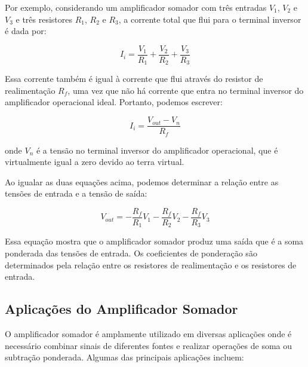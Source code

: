 \documentclass[12pt,twoside, a4paper, twocolumn]{article}
\begin{document}
Por exemplo, considerando um amplificador somador com três entradas $V_1$, $V_2$ e $V_3$ e três resistores $R_1$, $R_2$ e $R_3$, a corrente total que flui para o terminal inversor é dada por:


\begin{equation}
    I_i = \frac{V_1}{R_1} + \frac{V_2}{R_2} + \frac{V_3}{R_3}
\end{equation}


Essa corrente também é igual à corrente que flui através do resistor de realimentação $R_f$, uma vez que não há corrente que entra no terminal inversor do amplificador operacional ideal. Portanto, podemos escrever:


\begin{equation}
    I_i = \frac{V_{out} - V_n}{R_f}
\end{equation}


onde $V_n$ é a tensão no terminal inversor do amplificador operacional, que é virtualmente igual a zero devido ao terra virtual.


Ao igualar as duas equações acima, podemos determinar a relação entre as tensões de entrada e a tensão de saída:


\begin{equation}
    V_{out} = - \frac{R_f}{R_1} V_1 - \frac{R_f}{R_2} V_2 - \frac{R_f}{R_3} V_3
\end{equation}


Essa equação mostra que o amplificador somador produz uma saída que é a soma ponderada das tensões de entrada. Os coeficientes de ponderação são determinados pela relação entre os resistores de realimentação e os resistores de entrada.


\subsection{Aplicações do Amplificador Somador}


O amplificador somador é amplamente utilizado em diversas aplicações onde é necessário combinar sinais de diferentes fontes e realizar operações de soma ou subtração ponderada. Algumas das principais aplicações incluem:
\end{document}
